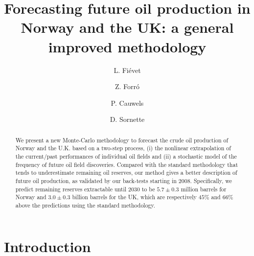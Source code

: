 \documentclass[review]{elsarticle}
\begin{document}
\thispagestyle{fancy} 


\title{Forecasting future oil production in Norway and the UK: a general improved methodology}

\author[eth-mtec]{L. Fi\'evet}

\author[eth-mtec]{Z. Forr\'o}

\author[eth-mtec]{P. Cauwels}

\author[eth-mtec]{D. Sornette}


\address[eth-mtec]{Chair of Entrepreneurial Risks, ETH Z\"urich, Scheuchzerstrasse 7 (SEC F), CH-8092 Z\"urich, Switzerland}


\maketitle
\begin{abstract}
\noindent We present a new Monte-Carlo methodology to forecast
the crude oil production of Norway and the U.K. based on a two-step process,
(i) the nonlinear extrapolation of the current/past
performances of individual oil fields and (ii) a stochastic model
of the frequency of future oil field discoveries. Compared
with the standard methodology that tends to underestimate remaining oil reserves,
our method gives a better description of future oil production, as validated by
our back-tests starting in 2008. Specifically, we predict remaining reserves
extractable until 2030 to be $5.7 \pm 0.3$ million barrels for Norway and $3.0 \pm0.3$ billion
barrels for the UK, which are respectively $45\%$ and $66\%$ above the
predictions using the standard methodology.
\end{abstract}

\section{Introduction}
\end{document}
